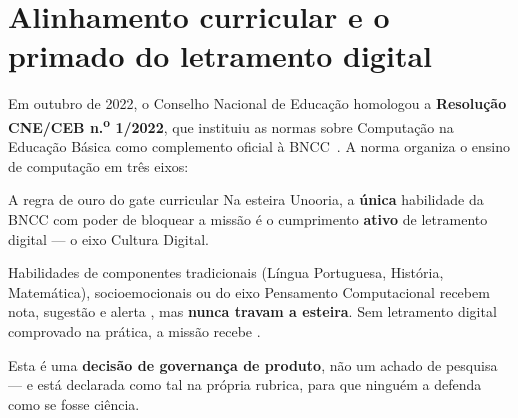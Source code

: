 \documentclass[11pt,a4paper]{article}
\newcommand{\bolinha}[1]{\tikz[baseline=-0.5ex]{\fill[#1] (0,0) circle (0.33em);}}
\newcommand{\statusAmbar}{\bolinha{sinalAmbar}}
\newcommand{\statusVermelho}{\bolinha{sinalVermelho}}
\begin{document}
\section{Alinhamento curricular e o primado do letramento digital}
\label{sec:bncc}

Em outubro de 2022, o Conselho Nacional de Educação homologou a \textbf{Resolução CNE/CEB n.\textsuperscript{o} 1/2022}, que instituiu as normas sobre Computação na Educação Básica como complemento oficial à BNCC~\cite{cne2022}. A norma organiza o ensino de computação em três eixos:

\begin{center}
\end{center}

\begin{caixaGuardrail}{A regra de ouro do gate curricular}
Na esteira Unooria, a \textbf{única} habilidade da BNCC com poder de bloquear a missão é o cumprimento \textbf{ativo} de letramento digital --- o eixo Cultura Digital.

Habilidades de componentes tradicionais (Língua Portuguesa, História, Matemática), socioemocionais ou do eixo Pensamento Computacional recebem nota, sugestão e alerta \statusAmbar, mas \textbf{nunca travam a esteira}. Sem letramento digital comprovado na prática, a missão recebe \statusVermelho.

Esta é uma \textbf{decisão de governança de produto}, não um achado de pesquisa --- e está declarada como tal na própria rubrica, para que ninguém a defenda como se fosse ciência.
\end{caixaGuardrail}
\end{document}
